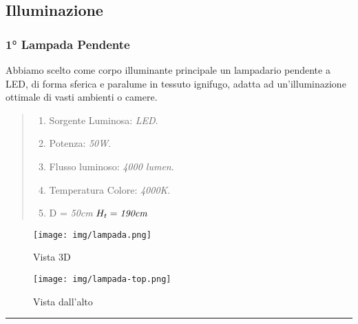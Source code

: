 \documentclass[italian, 12pt, a4paper]{article}
\begin{document}
\subsection{Illuminazione}
\subsubsection{1° Lampada Pendente}
Abbiamo scelto come corpo illuminante principale un lampadario pendente a LED, di forma sferica e paralume in tessuto ignifugo, adatta ad un'illuminazione ottimale di vasti ambienti o camere.
\begin{quote}
    \begin{enumerate}
        \item Sorgente Luminosa: \emph{LED}.
        \item Potenza: \emph{50W}.
        \item Flusso luminoso: \emph{4000 lumen}.
        \item Temperatura Colore: \emph{4000K}.
        \item D = \emph{50cm} $H_t = \emph{190cm}$
    \end{enumerate}
\end{quote}
\begin{figure}[h!]
    \centering
    \begin{minipage}{0.45\textwidth}
        \centering
        \texttt{[image: img/lampada.png]} %
        \caption{Vista 3D}
    \end{minipage} \hfill
    \begin{minipage}{0.45\textwidth}
        \centering
        \texttt{[image: img/lampada-top.png]} %
        \caption{Vista dall'alto}
    \end{minipage}
\end{figure}
\hrule
\end{document}
